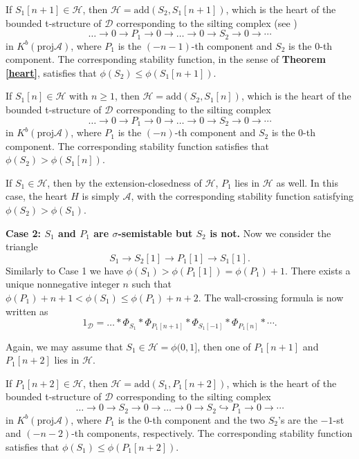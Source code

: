 \documentclass[a4paper,12pt]{amsart}
\newcommand{\add}{\mathrm{add}}
\newcommand{\proj}{\mathrm{proj}}
\begin{document}
If $S_1[n+1]\in\mathcal{H}$, then $\mathcal{H}=\add(S_2,S_1[n+1])$, which is the heart of the bounded t-structure of $\mathcal{D}$ corresponding to the silting complex (see \cite{KY2014})
\[\dots\rightarrow0\rightarrow P_1\rightarrow0\rightarrow\dots\rightarrow0\rightarrow S_2\rightarrow0\rightarrow\cdots\]
in $K^b(\proj\mathcal{A})$, where $P_1$ is the $(-n-1)$-th component and $S_2$ is the $0$-th component. The corresponding stability function, in the sense of \textbf{Theorem \ref{heart}}, satisfies that $\phi(S_2)\leqslant\phi(S_1[n+1])$.

If $S_1[n]\in\mathcal{H}$ with $n\geqslant1$, then $\mathcal{H}=\add(S_2,S_1[n])$, which is the heart of the bounded t-structure of $\mathcal{D}$ corresponding to the silting complex
\[\dots\rightarrow0\rightarrow P_1\rightarrow0\rightarrow\dots\rightarrow0\rightarrow S_2\rightarrow0\rightarrow\cdots\]
in $K^b(\proj\mathcal{A})$, where $P_1$ is the $(-n)$-th component and $S_2$ is the $0$-th component. The corresponding stability function satisfies that $\phi(S_2)>\phi(S_1[n])$.

If $S_1\in\mathcal{H}$, then by the extension-closedness of $\mathcal{H}$, $P_1$ lies in $\mathcal{H}$ as well. In this case, the heart $H$ is simply $\mathcal{A}$, with the corresponding stability function satisfying $\phi(S_2)>\phi(S_1)$.

\textbf{Case 2: $S_1$ and $P_1$ are $\sigma$-semistable but $S_2$ is not.} Now we consider the triangle
\[S_1\rightarrow S_2[1]\rightarrow P_1[1]\rightarrow S_1[1].\]
Similarly to Case 1 we have $\phi(S_1)>\phi(P_1[1])=\phi(P_1)+1$. There exists a unique nonnegative integer $n$ such that $\phi(P_1)+n+1<\phi(S_1)\leqslant\phi(P_1)+n+2$. The wall-crossing formula is now written as
\begin{equation}\label{2}
    1_\mathcal{D}=\dots*\Phi_{S_1}*\Phi_{P_1[n+1]}*\Phi_{S_1[-1]}*\Phi_{P_1[n]}*\cdots.
\end{equation}

Again, we may assume that $S_1\in\mathcal{H}=\phi(0,1]$, then one of $P_1[n+1]$ and $P_1[n+2]$ lies in $\mathcal{H}$. 

If $P_1[n+2]\in\mathcal{H}$, then $\mathcal{H}=\add(S_1,P_1[n+2])$, which is the heart of the bounded t-structure of $\mathcal{D}$ corresponding to the silting complex
\[\dots\rightarrow0\rightarrow S_2\rightarrow0\rightarrow\dots\rightarrow0\rightarrow S_2\hookrightarrow P_1\rightarrow0\rightarrow\cdots\]
in $K^b(\proj\mathcal{A})$, where $P_1$ is the $0$-th component and the two $S_2$'s are the $-1$-st and $(-n-2)$-th components, respectively. The corresponding stability function satisfies that $\phi(S_1)\leqslant\phi(P_1[n+2])$.
\end{document}
